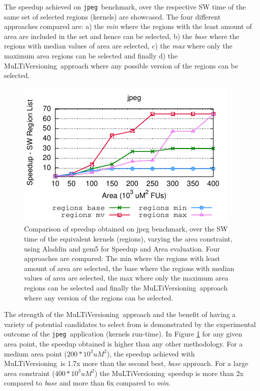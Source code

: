 \documentclass[]{usiinfthesis}
\newcommand{\multi}{MuLTiVersioning}
\newcommand{\jpeg}{\texttt{jpeg}}
\begin{document}
The speedup achieved on \jpeg\ benchmark, over the respective SW 
time of the same set of selected regions (kernels) %
are showcased. 
The four different approaches compared are:
a) the \emph{min} where the regions with the least amount of area are included in the set
and hence can be selected, b) the \emph{base} 
where the regions with median values of area are selected, c) the \emph{max} where only the maximum 
area regions can be selected and finally d) the \multi\ approach where any possible version 
of the regions can be selected. \par

\begin{figure}[h!]
\centering
\hspace*{-1cm}
\includegraphics[width= 0.7 \linewidth]{figs/plot_O3CPU_SW_large}
\caption{Comparison of speedup obtained on jpeg benchmark, over the
SW time of the equivalent kernels (regions), varying the area constraint, using 
Aladdin and gem5 for Speedup and Area evaluation.
Four approaches are compared: The 
min where the regions with least amount of area are selected, the base
where the regions with median values of area are selected, the max where 
only the maximum area regions can be selected and finally the \multi\
approach where any version of the regions can be selected.
}
\label{fig:mlv_aladdin}
\end{figure}

The strength of the \multi\ approach and the benefit of having 
a variety of potential candidates to select from 
is demonstrated by the experimental outcome of the \jpeg\ application (kernels run-time). 
In Figure \ref{fig:mlv_aladdin} for any given area point, the speedup obtained is higher than any other 
methodology. For a medium area point ($200 * 10^3 uM^2$), the 
speedup achieved with \multi\ is 1.7x more than the second best, \emph{base} approach. For 
a large area constraint ($400 * 10^3 uM^2$) the \multi\ speedup is more than 2x compared to
\emph{base} and more than 6x compared to \emph{min}.\par
\end{document}
